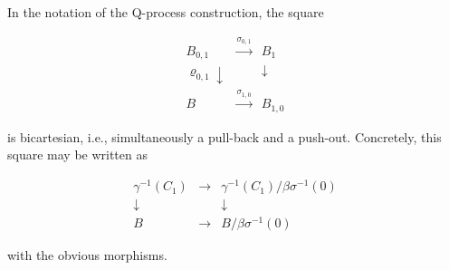 In the notation of the Q-process construction, the square

$$\begin{array}{ccc}
B_{0,1} & \xrightarrow{\sigma_{0,1}} & B_1 \\
\varrho_{0,1} \downarrow & & \downarrow \\
B & \xrightarrow{\sigma_{1,0}} & B_{1,0}
\end{array}$$

is bicartesian, i.e., simultaneously a pull-back and a push-out. Concretely, this square may be written as

$$\begin{array}{ccc}
\gamma^{-1}(C_1) & \longrightarrow & \gamma^{-1}(C_1) / \beta\sigma^{-1}(0) \\
\downarrow & & \downarrow \\
B & \longrightarrow & B / \beta\sigma^{-1}(0)
\end{array}$$

with the obvious morphisms.
